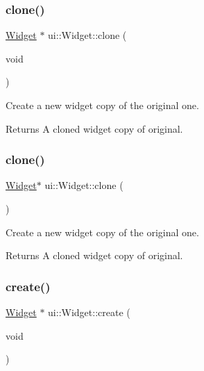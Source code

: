 \subsubsection{\texorpdfstring{clone()}{clone()}\hspace{0.1cm}{\footnotesize\ttfamily [1/2]}}
{\footnotesize\ttfamily \hyperlink{classui_1_1Widget}{Widget} $\ast$ ui\+::\+Widget\+::clone (\begin{DoxyParamCaption}\item[{void}]{ }\end{DoxyParamCaption})}

Create a new widget copy of the original one. \begin{DoxyReturn}{Returns}
A cloned widget copy of original. 
\end{DoxyReturn}
\mbox{\label{classui_1_1Widget_a4496285e3cc77f902260da953b55039c}} 
\subsubsection{\texorpdfstring{clone()}{clone()}\hspace{0.1cm}{\footnotesize\ttfamily [2/2]}}
{\footnotesize\ttfamily \hyperlink{classui_1_1Widget}{Widget}$\ast$ ui\+::\+Widget\+::clone (\begin{DoxyParamCaption}{ }\end{DoxyParamCaption})}

Create a new widget copy of the original one. \begin{DoxyReturn}{Returns}
A cloned widget copy of original. 
\end{DoxyReturn}
\mbox{\label{classui_1_1Widget_aa46d0b1357a7bbb7ed3c468e27a5533a}} 
\subsubsection{\texorpdfstring{create()}{create()}\hspace{0.1cm}{\footnotesize\ttfamily [1/2]}}
{\footnotesize\ttfamily \hyperlink{classui_1_1Widget}{Widget} $\ast$ ui\+::\+Widget\+::create (\begin{DoxyParamCaption}\item[{void}]{ }\end{DoxyParamCaption})\hspace{0.3cm}{\ttfamily [static]}}


